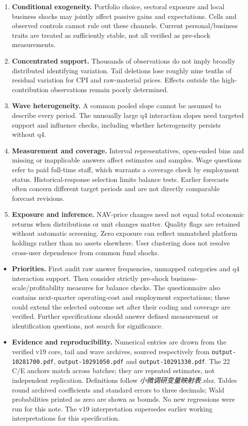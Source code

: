 \begin{enumerate}[leftmargin=*,itemsep=5pt]
\item \textbf{Conditional exogeneity.} Portfolio choice, sectoral exposure and local business shocks may jointly affect passive gains and expectations. Cells and observed controls cannot rule out these channels. Current personal/business traits are treated as sufficiently stable, not all verified as pre-shock measurements.
\item \textbf{Concentrated support.} Thousands of observations do not imply broadly distributed identifying variation. Tail deletions lose roughly nine tenths of residual variation for CPI and raw-material prices. Effects outside the high-contribution observations remain poorly determined.
\item \textbf{Wave heterogeneity.} A common pooled slope cannot be assumed to describe every period. The unusually large q4 interaction slopes need targeted support and influence checks, including whether heterogeneity persists without q4.
\item \textbf{Measurement and coverage.} Interval representatives, open-ended bins and missing or inapplicable answers affect estimates and samples. Wage questions refer to paid full-time staff, which warrants a coverage check by employment status. Historical-response selection limits balance tests. Earlier forecasts often concern different target periods and are not directly comparable forecast revisions.
\item \textbf{Exposure and inference.} NAV-price changes need not equal total economic returns when distributions or unit changes matter. Quality flags are retained without automatic screening. Zero exposure can reflect unmatched platform holdings rather than no assets elsewhere. User clustering does not resolve cross-user dependence from common fund shocks.
\end{enumerate}

\begin{itemize}
\item \textbf{Priorities.} First audit raw answer frequencies, unmapped categories and q4 interaction support. Then consider strictly pre-shock business-scale/profitability measures for balance checks. The questionnaire also contains next-quarter operating-cost and employment expectations; these could extend the selected outcome set after their coding and coverage are verified. Further specifications should answer defined measurement or identification questions, not search for significance.

\item \textbf{Evidence and reproducibility.} Numerical entries are drawn from the verified v19 core, tail and wave archives, sourced respectively from \texttt{output-10281700.pdf}, \texttt{output-10291050.pdf} and \texttt{output-10291330.pdf}. The 22 C/E anchors match across batches; they are repeated estimates, not independent replication. Definitions follow \textit{小微调研变量映射表.xlsx}. Tables round archived coefficients and standard errors to three decimals; Wald probabilities printed as zero are shown as bounds. No new regressions were run for this note. The v19 interpretation supersedes earlier working interpretations for this specification.
\end{itemize}
